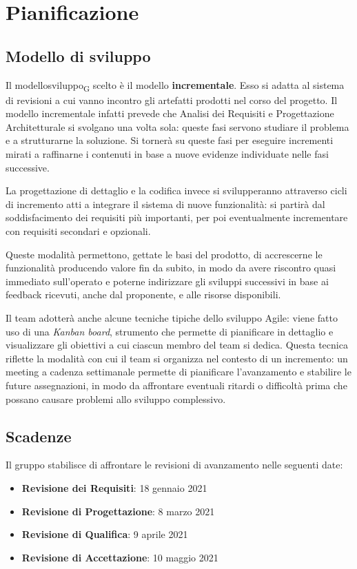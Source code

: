\section{Pianificazione}

\subsection{Modello di sviluppo}

Il \gls{modellosviluppo}\textsubscript{G} scelto è il modello \textbf{incrementale}. Esso si adatta al sistema di revisioni a cui vanno incontro gli artefatti prodotti nel corso del progetto. Il modello incrementale infatti prevede che Analisi dei Requisiti e Progettazione Architetturale si svolgano una volta sola: queste fasi servono studiare il problema e a strutturarne la soluzione. Si tornerà su queste fasi per eseguire incrementi mirati a raffinarne i contenuti in base a nuove evidenze individuate nelle fasi successive.

La progettazione di dettaglio e la codifica invece si svilupperanno attraverso cicli di incremento atti a integrare il sistema di nuove funzionalità: si partirà dal soddisfacimento dei requisiti più importanti, per poi eventualmente incrementare con requisiti secondari e opzionali. 

Queste modalità permettono, gettate le basi del prodotto, di accrescerne le funzionalità producendo valore fin da subito, in modo da avere riscontro quasi immediato sull'operato e poterne indirizzare gli sviluppi successivi in base ai feedback ricevuti, anche dal proponente, e alle risorse disponibili.

Il team adotterà anche alcune tecniche tipiche dello sviluppo Agile: viene fatto uso di una \textit{Kanban board}, strumento che permette di pianificare in dettaglio e visualizzare gli obiettivi a cui ciascun membro del team si dedica. Questa tecnica riflette la modalità con cui il team si organizza nel contesto di un incremento: un meeting a cadenza settimanale permette di pianificare l'avanzamento e stabilire le future assegnazioni, in modo da affrontare eventuali ritardi o difficoltà prima che possano causare problemi allo sviluppo complessivo.



\subsection{Scadenze}

Il gruppo stabilisce di affrontare le revisioni di avanzamento nelle seguenti date:
\begin{itemize}
	\item \textbf{Revisione dei Requisiti}: 18 gennaio 2021
	\item \textbf{Revisione di Progettazione}: 8 marzo 2021 
	\item \textbf{Revisione di Qualifica}: 9 aprile 2021
	\item \textbf{Revisione di Accettazione}: 10 maggio 2021	
\end{itemize}





